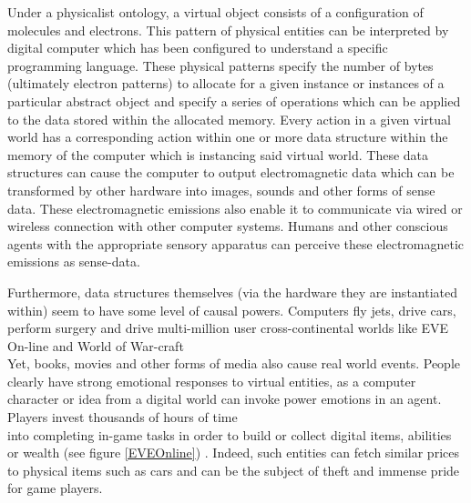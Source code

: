   Under a physicalist ontology, a virtual object consists of a configuration of molecules and electrons. This pattern of physical entities can be interpreted by digital computer which has been configured to understand a specific programming language. These physical patterns specify the number of bytes (ultimately electron patterns) to allocate for a given instance or instances of a particular abstract object and specify a series of operations which can be applied to the data stored within the allocated memory. Every action in a given virtual world has a corresponding action within one or more data structure within the memory of the computer which is instancing said virtual world. These data structures can cause the computer to output electromagnetic data which can be transformed by other hardware into images, sounds and other forms of sense data. These electromagnetic emissions also enable it to communicate via wired or wireless connection with other computer systems. Humans and other conscious agents with the appropriate sensory apparatus can perceive these electromagnetic emissions as sense-data.
  \newline
  
  
 Furthermore, data structures themselves (via the hardware they are instantiated within) seem to have some level of causal powers. Computers fly jets, drive cars, perform surgery and drive multi-million user cross-continental worlds like EVE On-line and World of War-craft \\
 Yet, books, movies and other forms of media also cause real world events. People clearly have strong emotional responses to virtual entities, as a computer character or idea from a digital world can invoke power emotions in an agent. Players invest thousands of hours of time \\
 into completing in-game tasks in order to build or collect digital items, abilities or wealth (see figure \ref{EVEOnline})
. Indeed, such entities can fetch similar prices to physical items such as cars and can be the subject of theft and immense pride for game players. \cite{EVEArticle}
 
 
 
